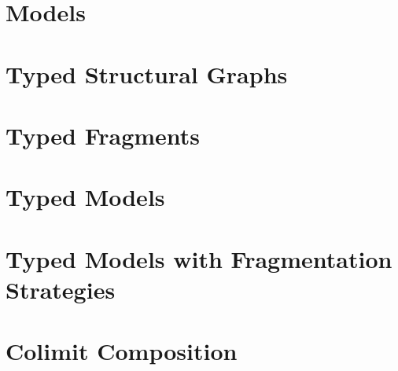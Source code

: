 

\section{Models}



\section{Typed Structural Graphs}



\section{Typed Fragments}



\section{Typed Models}



\section{Typed Models with Fragmentation Strategies}



\section{Colimit Composition}




